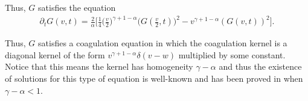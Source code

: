 \documentclass[11pt]{article}
\numberwithin{equation}{section}
\begin{document}
 Thus, $G$ satisfies the equation
\begin{align}\label{first diagonal}
    \partial_{t}G(v,t)=    \frac{2}{\alpha}\bigg[ \frac{1}{4}\bigg(\frac{v}{2}\bigg)^{\gamma+1-\alpha}\bigg(G(\frac{v}{2},t)\bigg)^{2}-v^{\gamma+1-\alpha}(G(v,t))^{2}\bigg].
\end{align}
\begin{rmk}\label{remark homogeneity decreases}
Thus, $G$ satisfies a coagulation equation in which the coagulation kernel is a diagonal kernel of the form $v^{\gamma+1-\alpha}\delta(v-w)$ multiplied by some constant. Notice that this means the kernel has homogeneity $\gamma-\alpha$ and thus the existence of solutions for this type of equation is well-known and has been proved in \cite{diagonal, leyvraz,diagonal2} when $\gamma-\alpha<1$.  
\end{rmk}
\end{document}
